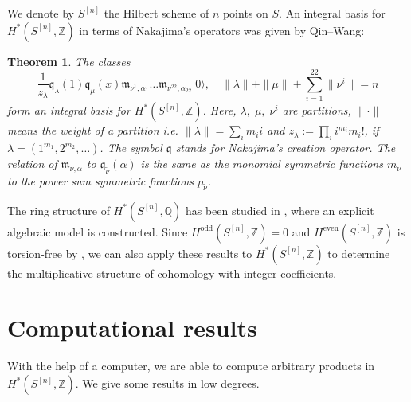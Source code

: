 \documentclass{amsart}
\newcommand{\hilb}[1]{^{[#1]}}
\newcommand{\ie}{{\it i.e. }}
\newcommand{\vac}{|0\rangle}
\newcommand{\coloneqq}{:=}
\newcommand{\IQ}{\mathbb{Q}}
\newcommand{\IZ}{\mathbb{Z}}
\newcommand{\km}{\mathfrak{m}}
\newcommand{\kq}{\mathfrak{q}}
\theoremstyle{plain}
\newtheorem{theorem}{Theorem}[section]
\theoremstyle{definition}
\theoremstyle{remark}
\begin{document}
We denote by $S\hilb{n}$ the Hilbert scheme of $n$ points on $S$. An integral basis for $H^\ast(S\hilb{n},\IZ)$ in terms of Nakajima's operators was given by Qin--Wang:
\begin{theorem} \cite[Thm. 5.4.]{QinWang} The classes
$$ \frac{1}{z_\lambda} \kq_\lambda(1)\kq_\mu(x)\km_{\nu^1,\alpha_1}\ldots\km_{\nu^{22},\alpha_{22}}\vac,\quad \|\lambda\| +\|\mu\| + \sum_{i=1}^{22}\|\nu^i\| = n
$$ 
form an integral basis for $H^\ast(S\hilb{n},\IZ)$. Here,
$\lambda,\; \mu,\; \nu^i$ are partitions, $\|\cdot\|$ means the weight of a partition \ie $\|\lambda\| = \sum_i m_i i$ and $z_\lambda \coloneqq\prod_i i^{m_i} m_i!$, if $\lambda = (1^{m_1},2^{m_2},\ldots)$. The symbol $\kq$ stands for Nakajima's creation operator. 
The relation of $\km_{\nu,\alpha}$ to $\kq_{\tilde{\nu}}(\alpha)$ is the same as the monomial symmetric functions
$m_\nu$ to the power sum symmetric functions 
$p_{\tilde{\nu}}$.
\end{theorem}
The ring structure of $H^\ast(S\hilb{n}, \IQ)$ has been studied in \cite{LehnSorger}, where an explicit algebraic model is constructed.
Since $H^\text{odd}(S\hilb{n},\IZ) = 0$ and $H^\text{even}(S\hilb{n},\IZ)$ is torsion-free by \cite{Markman}, we can also apply these results to  $H^\ast(S\hilb{n}, \IZ)$ to determine the multiplicative structure of cohomology with integer coefficients.


\section{Computational results}
With the help of a computer, we are able to compute arbitrary products in $H^\ast(S\hilb{n},\IZ)$.
We give some results in low degrees. 
\end{document}
